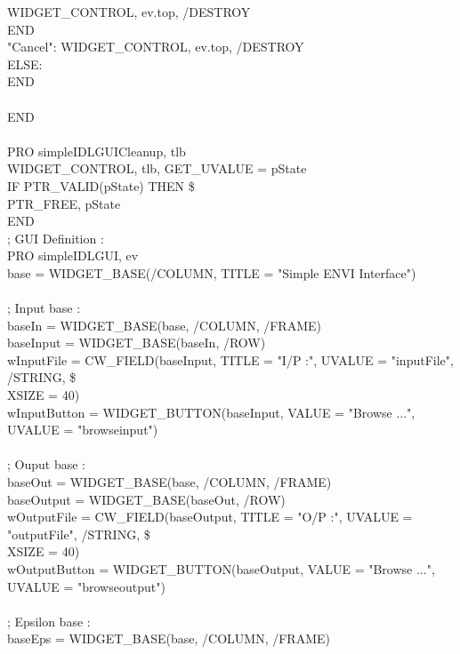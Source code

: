 \begin{scriptsize}
\indent \indent \indent WIDGET\_CONTROL, ev.top, /DESTROY\\
\indent \indent END\\
\indent \indent "Cancel": WIDGET\_CONTROL, ev.top, /DESTROY\\
\indent \indent ELSE:\\
\indent END\\
\\
\indent END\\
\\
\indent PRO simpleIDLGUICleanup, tlb\\
\indent WIDGET\_CONTROL, tlb, GET\_UVALUE = pState\\
\indent IF PTR\_VALID(pState) THEN \$\\
\indent \indent PTR\_FREE, pState\\
\indent END\\
\indent ; GUI Definition :\\
\indent PRO simpleIDLGUI, ev\\
\indent base = WIDGET\_BASE(/COLUMN, TITLE = "Simple ENVI Interface")\\
\\
\indent ; Input base :\\
\indent baseIn = WIDGET\_BASE(base, /COLUMN, /FRAME)\\
\indent baseInput = WIDGET\_BASE(baseIn, /ROW)\\
\indent wInputFile = CW\_FIELD(baseInput, TITLE = "I/P :", UVALUE = "inputFile", /STRING, \$\\
\indent XSIZE = 40)\\
\indent wInputButton = WIDGET\_BUTTON(baseInput, VALUE = "Browse ...", UVALUE = "browseinput")\\
\\
\indent ; Ouput base :\\
\indent baseOut = WIDGET\_BASE(base, /COLUMN, /FRAME)\\
\indent baseOutput = WIDGET\_BASE(baseOut, /ROW)\\
\indent wOutputFile = CW\_FIELD(baseOutput, TITLE = "O/P :", UVALUE = "outputFile", /STRING, \$\\
\indent XSIZE = 40)\\
\indent wOutputButton = WIDGET\_BUTTON(baseOutput, VALUE = "Browse ...", UVALUE = "browseoutput")\\
\\
\indent ; Epsilon base :\\
\indent baseEps = WIDGET\_BASE(base, /COLUMN, /FRAME)\\

\end{scriptsize}

